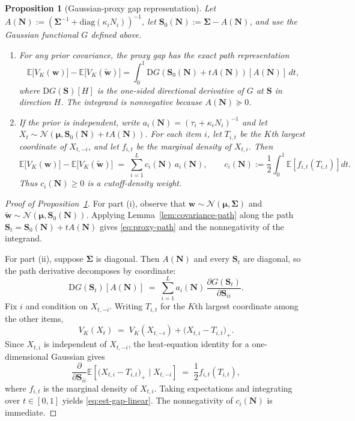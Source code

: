 \documentclass[11pt]{article}
\newtheorem{proposition}[theorem]{Proposition}
\theoremstyle{definition}
\theoremstyle{remark}
\newcommand{\E}{\mathbb{E}}
\newcommand{\1}{\mathbf{1}}
\newcommand{\w}{\mathbf{w}}
\newcommand{\diag}{\mathrm{diag}}
\newcommand{\Normal}{\mathcal{N}}
\newcommand{\bmu}{\boldsymbol{\mu}}
\newcommand{\bSigma}{\boldsymbol{\Sigma}}
\newcommand{\N}{\mathbf{N}}
\newcommand{\bS}{\mathbf{S}}
\begin{document}
\medskip

\begin{proposition}[Gaussian-proxy gap representation]
\label{prop:sep}
Let \(A(\N):=(\bSigma^{-1}+\diag(\kappa_i N_i))^{-1}\), let
\(\bS_0(\N):=\bSigma-A(\N)\), and use the Gaussian functional \(G\)
defined above.
\begin{enumerate}[leftmargin=*]
\item For any prior covariance, the proxy gap has the exact path
      representation
      \begin{equation}\label{eq:proxy-path}
      \E\!\big[V_K(\w)\big]-\E\!\big[V_K(\tilde{\w})\big]
      =
      \int_0^1
      \mathrm{D}G\!\left(\bS_0(\N)+tA(\N)\right)[A(\N)]\,dt,
      \end{equation}
      where \(\mathrm{D}G(\bS)[H]\) is the one-sided directional
      derivative of \(G\) at \(\bS\) in direction \(H\). The integrand
      is nonnegative because \(A(\N)\succeq0\).
\item If the prior is independent, write
      \(a_i(\N)=(\tau_i+\kappa_iN_i)^{-1}\) and let
      \(X_t\sim\Normal(\bmu,\bS_0(\N)+tA(\N))\). For each item \(i\),
      let \(T_{i,t}\) be the \(K\)th largest coordinate of
      \(X_{t,-i}\), and let \(f_{i,t}\) be the marginal density of
      \(X_{t,i}\). Then
      \begin{equation}\label{eq:est-gap-linear}
      \E\!\big[V_K(\w)\big]-\E\!\big[V_K(\tilde{\w})\big]
      \;=\;
      \sum_{i=1}^L c_i(\N)\,a_i(\N),
      \qquad
      c_i(\N):=\frac12\int_0^1 \E\!\left[f_{i,t}(T_{i,t})\right]dt.
      \end{equation}
      Thus \(c_i(\N)\ge0\) is a cutoff-density weight.
\end{enumerate}
\end{proposition}

\begin{proof}[Proof of Proposition~\ref{prop:sep}]
For part (i), observe that \(\w\sim\Normal(\bmu,\bSigma)\) and
\(\tilde{\w}\sim\Normal(\bmu,\bS_0(\N))\). Applying
Lemma~\ref{lem:covariance-path} along the path
\(\bS_t=\bS_0(\N)+tA(\N)\) gives \eqref{eq:proxy-path} and the
nonnegativity of the integrand.

For part (ii), suppose \(\bSigma\) is diagonal. Then \(A(\N)\) and every
\(\bS_t\) are diagonal, so the path derivative decomposes by coordinate:
\[
\mathrm{D}G(\bS_t)[A(\N)]
\;=\;
\sum_{i=1}^L a_i(\N)\,
\frac{\partial G(\bS_t)}{\partial \bS_{ii}}.
\]
Fix \(i\) and condition on \(X_{t,-i}\). Writing \(T_{i,t}\) for the
\(K\)th largest coordinate among the other items,
\[
V_K(X_t)
\;=\;
V_K(X_{t,-i})+\big(X_{t,i}-T_{i,t}\big)_+ .
\]
Since \(X_{t,i}\) is independent of \(X_{t,-i}\), the heat-equation
identity for a one-dimensional Gaussian gives
\[
\frac{\partial}{\partial \bS_{ii}}
\E\!\left[\big(X_{t,i}-T_{i,t}\big)_+\mid X_{t,-i}\right]
\;=\;
\frac12 f_{i,t}(T_{i,t}),
\]
where \(f_{i,t}\) is the marginal density of \(X_{t,i}\). Taking
expectations and integrating over \(t\in[0,1]\) yields
\eqref{eq:est-gap-linear}. The nonnegativity of \(c_i(\N)\) is
immediate.
\end{proof}
\end{document}
